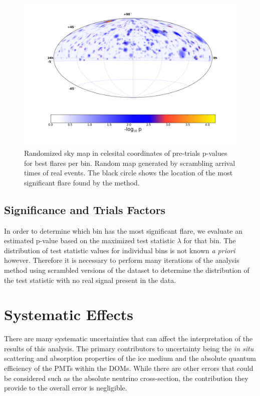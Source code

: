 \documentclass{gatech-thesis}
\begin{document}
\begin{figure}[ht]
  \begin{center}
    \includegraphics[width=1.0\textwidth,keepaspectratio]{NullMap996.png}
  \end{center}
  \caption{Randomized sky map in celesital coordinates of pre-trials p-values for best flares per bin. Random map generated by scrambling arrival times of real events. The black circle shows the location of the most significant flare found by the method. }
  \label{fig:NullTrialSkyMap}
\end{figure}

\section{Significance and Trials Factors}
In order to determine which bin has the most significant flare, we evaluate an estimated p-value based on the maximized test statistic $\lambda$ for that bin. The distribution of test statistic values for individual bins is not known \textit{a priori} however. Therefore it is necessary to perform many iterations of the analysis method using scrambled versions of the dataset to determine the distribution of the test statistic with no real signal present in the data.

\chapter{Systematic Effects}
There are many systematic uncertainties that can affect the interpretation of the results of this analysis. The primary contributors to uncertainty being the \textit{in situ} scattering and absorption properties of the ice medium and the absolute quantum efficiency of the PMTs within the DOMs. While there are other errors that could be considered such as the absolute neutrino cross-section, the contribution they provide to the overall error is negligible.
\end{document}
